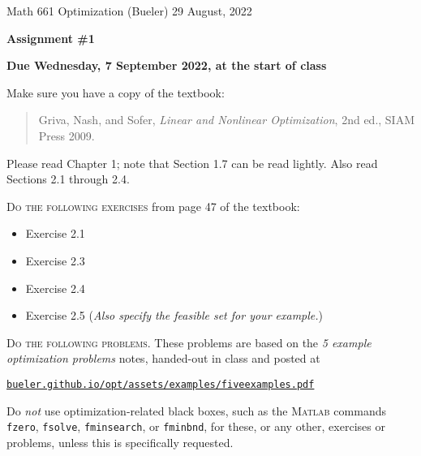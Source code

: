 \documentclass[12pt]{amsart}
\newcommand{\Matlab}{\textsc{Matlab}\xspace}
\begin{document}
\scriptsize \noindent Math 661 Optimization (Bueler) \hfill 29 August, 2022
\normalsize

\medskip\bigskip

\Large\centerline{\textbf{Assignment \#1}}
\large
\bigskip

\centerline{\textbf{Due Wednesday, 7 September 2022, at the start of class}}
\bigskip
\normalsize

\thispagestyle{empty}

\bigskip
\noindent Make sure you have a copy of the textbook:

\begin{quote}
Griva, Nash, and Sofer, \emph{Linear and Nonlinear Optimization}, 2nd ed., SIAM Press 2009.
\end{quote}

\noindent Please read Chapter 1; note that Section 1.7 can be read lightly.  Also read Sections 2.1 through 2.4.

\bigskip
\noindent \textsc{Do the following exercises} from page 47 of the textbook:

\begin{itemize}
\item Exercise 2.1
\item Exercise 2.3
\item Exercise 2.4
\item Exercise 2.5 \quad (\emph{Also specify the feasible set for your example.})
\end{itemize}

\bigskip
\noindent \textsc{Do the following problems.}  These problems are based on the \emph{5 example optimization problems} notes, handed-out in class and posted at

\centerline{\href{https://bueler.github.io/opt/assets/examples/fiveexamples.pdf}{\texttt{bueler.github.io/opt/assets/examples/fiveexamples.pdf}}}

\noindent Do \emph{not} use optimization-related black boxes, such as the \Matlab commands \texttt{fzero}, \texttt{fsolve}, \texttt{fminsearch}, or \texttt{fminbnd}, for these, or any other, exercises or problems, unless this is specifically requested.
\end{document}
